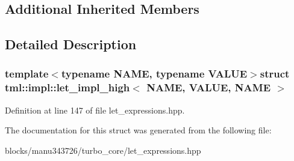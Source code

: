 \subsection*{Additional Inherited Members}


\subsection{Detailed Description}
\subsubsection*{template$<$typename N\+A\+M\+E, typename V\+A\+L\+U\+E$>$struct tml\+::impl\+::let\+\_\+impl\+\_\+high$<$ N\+A\+M\+E, V\+A\+L\+U\+E, N\+A\+M\+E $>$}



Definition at line 147 of file let\+\_\+expressions.\+hpp.



The documentation for this struct was generated from the following file\+:\begin{DoxyCompactItemize}
\item 
blocks/manu343726/turbo\+\_\+core/let\+\_\+expressions.\+hpp\end{DoxyCompactItemize}
